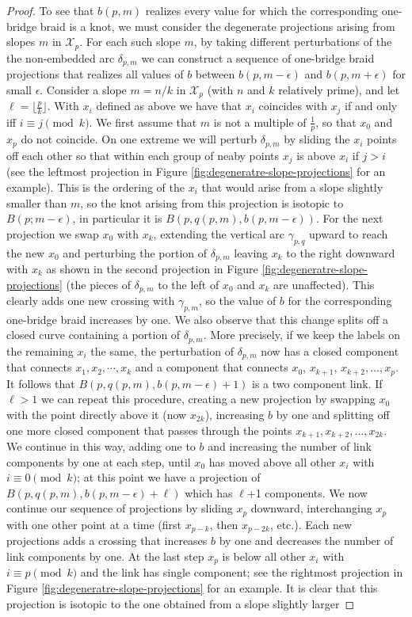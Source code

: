 \documentclass{amsart}
\theoremstyle{definition}
\theoremstyle{remark}
\numberwithin{equation}{section}
\numberwithin{equation}{section} \makeatletter
\begin{document}
\begin{proof}
To see that $b(p,m)$ realizes every value for which the corresponding one-bridge braid is a knot, we must consider the degenerate projections arising from slopes $m$ in $\mathcal{X}_p$. For each such slope $m$, by taking different perturbations of the the non-embedded arc $\delta_{p,m}$ we can construct a sequence of one-bridge braid projections that realizes all values of $b$ between $b(p, m-\epsilon)$ and $b(p, m+\epsilon)$ for small $\epsilon$. Consider a slope $m = n/k$ in $\mathcal{X}_p$ (with $n$ and $k$ relatively prime), and let $\ell = \lfloor \frac p k \rfloor$. With $x_i$ defined as above we have that $x_i$ coincides with $x_j$ if and only iff $i \equiv j \pmod{k}$. We first assume that $m$ is not a multiple of $\frac 1 p$, so that $x_0$ and $x_p$ do not coincide. On one extreme we will perturb $\delta_{p,m}$ by sliding the $x_i$ points off each other so that within each group of neaby points $x_j$ is above $x_i$ if $j > i$ (see the leftmost projection in Figure \ref{fig:degeneratre-slope-projections} for an example). This is the ordering of the $x_i$ that would arise from a slope slightly smaller than $m$, so the knot arising from this projection is isotopic to $B(p; m-\epsilon)$, in particular it is $B(p,q(p,m),b(p,m-\epsilon))$. For the next projection we swap $x_0$ with $x_k$, extending the vertical arc $\gamma_{p,q}$ upward to reach the new $x_0$ and perturbing the portion of $\delta_{p,m}$ leaving $x_k$ to the right downward with $x_k$ as shown in the second projection in Figure \ref{fig:degeneratre-slope-projections} (the pieces of $\delta_{p,m}$ to the left of $x_0$ and $x_k$ are unaffected). This clearly adds one new crossing with $\gamma_{p,m}$, so the value of $b$ for the corresponding one-bridge braid increases by one. We also observe that this change splits off a closed curve containing a portion of $\delta_{p,m}$. More precisely, if we keep the labels on the remaining $x_i$ the same, the perturbation of $\delta_{p,m}$ now has a closed component that connects $x_1, x_2, \cdots, x_k$ and a component that connects $x_0$, $x_{k+1}$, $x_{k+2}, \ldots, x_p$. It follows that $B(p, q(p,m), b(p,m-\epsilon)+1)$ is a two component link. If $\ell > 1$ we can repeat this procedure, creating a new projection by swapping $x_0$ with the point directly above it (now $x_{2k}$), increasing $b$ by one and splitting off one more closed component that passes through the points $x_{k+1}, x_{k+2}, \ldots, x_{2k}$. We continue in this way, adding one to $b$ and increasing the number of link components by one at each step, until $x_0$ has moved above all other $x_i$ with $i \equiv 0 \pmod k$; at this point we have a projection of $B(p,q(p,m),b(p,m-\epsilon)+\ell)$ which has $\ell$+1 components. We now continue our sequence of projections by sliding $x_p$ downward, interchanging $x_p$ with one other point at a time (first $x_{p-k}$, then $x_{p-2k}$, etc.). Each new projections adds a crossing that increases $b$ by one and decreases the number of link components by one. At the last step $x_p$ is below all other $x_i$ with $i \equiv p \pmod k$ and the link has single component; see the rightmost projection in Figure \ref{fig:degeneratre-slope-projections} for an example. It is clear that this projection is isotopic to the one obtained from a slope slightly larger 
\end{proof}
\end{document}
